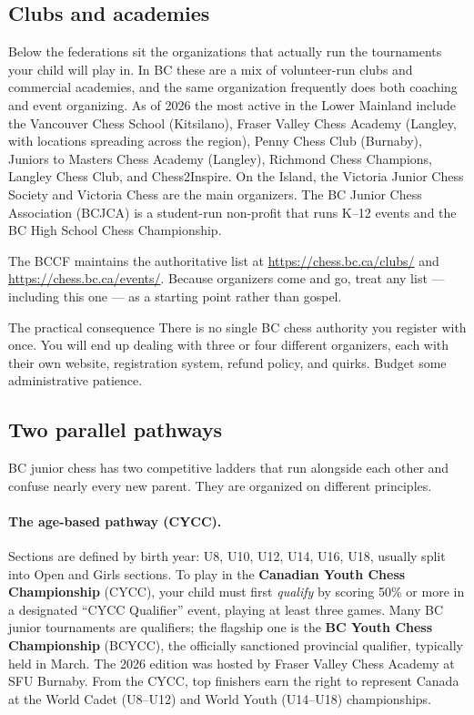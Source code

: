 \documentclass[10pt,letterpaper]{article}
\newcommand{\term}[1]{\textbf{#1}}
\begin{document}
\subsection{Clubs and academies}

Below the federations sit the organizations that actually run the tournaments
your child will play in. In BC these are a mix of volunteer-run clubs and
commercial academies, and the same organization frequently does both coaching
and event organizing. As of 2026 the most active in the Lower Mainland include
the Vancouver Chess School (Kitsilano), Fraser Valley Chess Academy (Langley,
with locations spreading across the region), Penny Chess Club (Burnaby), Juniors to Masters Chess Academy (Langley), 
Richmond Chess Champions, Langley Chess Club, and Chess2Inspire. On the Island,
the Victoria Junior Chess Society and Victoria Chess are the main organizers.
The BC Junior Chess Association (BCJCA) is a student-run non-profit that runs
K--12 events and the BC High School Chess Championship.

The BCCF maintains the authoritative list at \url{https://chess.bc.ca/clubs/}
and \url{https://chess.bc.ca/events/}. Because organizers come and go, treat
any list --- including this one --- as a starting point rather than gospel.

\begin{keybox}{The practical consequence}
There is no single BC chess authority you register with once. You will end up
dealing with three or four different organizers, each with their own website,
registration system, refund policy, and quirks. Budget some administrative
patience.
\end{keybox}

\subsection{Two parallel pathways}
\label{sec:pathways}

BC junior chess has two competitive ladders that run alongside each other and
confuse nearly every new parent. They are organized on different principles.

\paragraph{The age-based pathway (CYCC).} Sections are defined by birth year:
U8, U10, U12, U14, U16, U18, usually split into Open and Girls sections. To
play in the \term{Canadian Youth Chess Championship} (CYCC), your child must
first \emph{qualify} by scoring 50\% or more in a designated ``CYCC Qualifier''
event, playing at least three games. Many BC junior tournaments are qualifiers;
the flagship one is the \term{BC Youth Chess Championship} (BCYCC), the
officially sanctioned provincial qualifier, typically held in March. The 2026
edition was hosted by Fraser Valley Chess Academy at SFU Burnaby. From the CYCC,
top finishers earn the right to represent Canada at the World Cadet (U8--U12)
and World Youth (U14--U18) championships.
\end{document}
